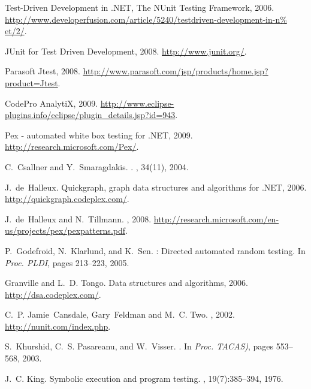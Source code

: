 \documentclass{sig-alternate}
\begin{document}
\begin{thebibliography}{10}
\begin{scriptsize}
{Test-Driven Development in {.NET}, The {NUnit} Testing Framework}, 2006.
\newblock
  \url{http://www.developerfusion.com/article/5240/testdriven-development-in-n%
et/2/}.

{JUnit for Test Driven Development}, 2008.
\newblock \url{http://www.junit.org/}.

{Parasoft {Jtest}}, 2008.
\newblock \url{http://www.parasoft.com/jsp/products/home.jsp?product=Jtest}.

{CodePro AnalytiX}, 2009.
\newblock
  \url{http://www.eclipse-plugins.info/eclipse/plugin_details.jsp?id=943}.

Pex - automated white box testing for {.NET}, 2009.
\newblock \url{http://research.microsoft.com/Pex/}.

C.~Csallner and Y.~Smaragdakis.
.
, 34(11), 2004.

J.~de~Halleux.
\newblock Quickgraph, graph data structures and algorithms for {.NET}, 2006.
\newblock \url{http://quickgraph.codeplex.com/}.

J.~de~Halleux and N.~Tillmann.
, 2008.
\newblock
  \url{http://research.microsoft.com/en-us/projects/pex/pexpatterns.pdf}.

P.~Godefroid, N.~Klarlund, and K.~Sen.
: Directed automated random testing.
\newblock In {\em Proc. PLDI}, pages 213--223, 2005.

Granville and L.~D. Tongo.
\newblock Data structures and algorithms, 2006.
\newblock \url{http://dsa.codeplex.com/}.

C.~P. Jamie~Cansdale, Gary~Feldman and M.~C. Two.
, 2002.
\newblock \url{http://nunit.com/index.php}.

S.~Khurshid, C.~S. Pasareanu, and W.~Visser.
.
\newblock In {\em Proc. TACAS)}, pages 553--568, 2003.

J.~C. King.
\newblock Symbolic execution and program testing.
, 19(7):385--394, 1976.


\end{scriptsize}
\end{thebibliography}
\end{document}
